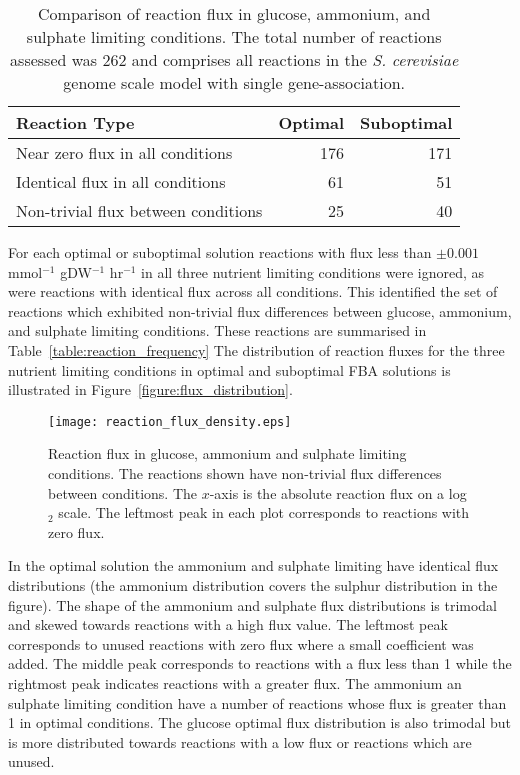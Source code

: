 \begin{table}%
  \centering
  \begin{tabular}{l r r}
                                                                  \toprule
    Reaction Type                       & Optimal & Suboptimal \\ \midrule
    Near zero flux in all conditions    & 176     & 171        \\
    Identical flux in all conditions    & 61      & 51         \\
    Non-trivial flux between conditions & 25      & 40         \\ \bottomrule
  \end{tabular}
  \caption[Comparison of reaction flux across environments]{Comparison of reaction flux in glucose, ammonium, and sulphate limiting conditions. The total number of reactions assessed was 262 and comprises all reactions in the \emph{S. cerevisiae} genome scale model with single gene-association. }
  \label{table:reaction_frequency}
\end{table}%

For each optimal or suboptimal solution reactions with flux less than $\pm0.001$ mmol$^{-1}$ gDW$^{-1}$ hr$^{-1}$ in all three nutrient limiting conditions were ignored, as were reactions with identical flux across all conditions. This identified the set of reactions which exhibited non-trivial flux differences between glucose, ammonium, and sulphate limiting conditions. These reactions are summarised in Table~\vref{table:reaction_frequency} The distribution of reaction fluxes for the three nutrient limiting conditions in optimal and suboptimal FBA solutions is illustrated in Figure~\vref{figure:flux_distribution}.

\begin{figure}%
  \centering
  \texttt{[image: reaction\_flux\_density.eps]}
  \caption[Reaction flux in glucose, ammonium and sulphate limitation]{Reaction flux in glucose, ammonium and sulphate limiting conditions. The reactions shown have non-trivial flux differences between conditions. The $x$-axis is the absolute reaction flux on a log$_2$ scale. The leftmost peak in each plot corresponds to reactions with zero flux. }
  \label{figure:flux_distribution}
\end{figure}%

In the optimal solution the ammonium and sulphate limiting have identical flux distributions (the ammonium distribution covers the sulphur distribution in the figure). The shape of the ammonium and sulphate flux distributions is trimodal and skewed towards reactions with a high flux value. The leftmost peak corresponds to unused reactions with zero flux where a small coefficient was added. The middle peak corresponds to reactions with a flux less than 1 while the rightmost peak indicates reactions with a greater flux. The ammonium an sulphate limiting condition have a number of reactions whose flux is greater than 1 in optimal conditions. The glucose optimal flux distribution is also trimodal but is more distributed towards reactions with a low flux or reactions which are unused.

